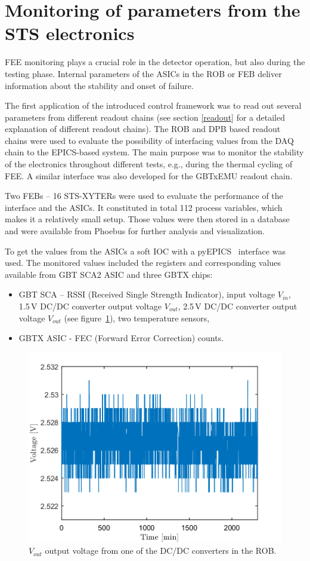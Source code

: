 
\section{Monitoring of parameters from the STS electronics}

\gls{FEE} monitoring plays a crucial role in the detector operation, but also during the testing phase. Internal parameters of the \glspl{ASIC} in the \gls{ROB} or \gls{FEB} deliver information about the stability and onset of failure.


The first application of the introduced control framework was to read out several parameters from different readout chains (see section \ref{readout} for a detailed explanation of different readout chains). The \gls{ROB} and \gls{DPB} based readout chains were used to evaluate the possibility of interfacing values from the \gls{DAQ} chain to the \gls{EPICS}-based system. The main purpose was to monitor the stability of the electronics throughout different tests, e.g., during the thermal cycling of \gls{FEE}. A similar interface was also developed for the GBTxEMU readout chain. 

Two \glspl{FEB} -- 16 STS-XYTERs were used to evaluate the performance of the interface and the ASICs. It constituted in total 112 process variables, which makes it a relatively small setup. Those values were then stored in a database and were available from Phoebus for further analysis and visualization.

To get the values from the \glspl{ASIC} a soft \gls{IOC} with a pyEPICS~\cite{pyEPICS} interface was used. The monitored values included the registers and corresponding values available from \gls{GBT} \gls{SCA2} \gls{ASIC} \cite{GBT_SCA_ASIC} and three GBTX chips: 
\begin{itemize}
    \item GBT SCA -- RSSI (Received Single Strength Indicator), input voltage $V_{in}$, 1.5\,V DC/DC converter output voltage $V_{out}$, 2.5\,V DC/DC converter output voltage $V_{out}$ (see figure~\ref{fig:ROB}), two temperature sensors,
    \item GBTX \gls{ASIC} - FEC (Forward Error Correction) counts.
\end{itemize}

\begin{figure}[!h]
    \centering
    \includegraphics[width=0.65\columnwidth]{Chapter4/images/ROB.png}
    \caption{$V_{out}$ output voltage from one of the DC/DC converters in the \gls{ROB}.}
    \label{fig:ROB}
\end{figure}

